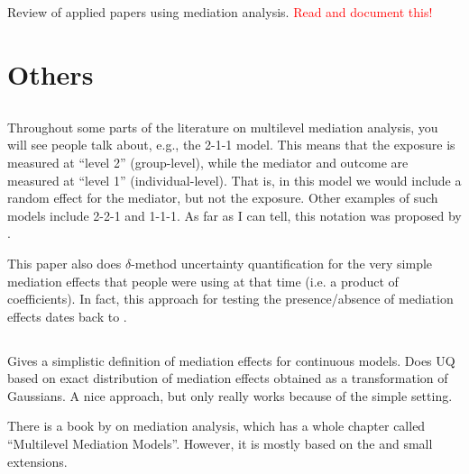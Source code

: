 \documentclass{report}
\begin{document}
\subsection{\citet{Rij21}}

Review of applied papers using mediation analysis. \textcolor{red}{Read and document this!}


\section{Others}
\label{sec:other}

\subsection{\citet{Kru01}}

Throughout some parts of the literature on multilevel mediation analysis, you will see people talk about, e.g., the 2-1-1 model. This means that the exposure is measured at ``level 2'' (group-level), while the mediator and outcome are measured at ``level 1'' (individual-level). That is, in this model we would include a random effect for the mediator, but not the exposure. Other examples of such models include 2-2-1 and 1-1-1. As far as I can tell, this notation was proposed by \citet{Kru01}.

This paper also does $\delta$-method uncertainty quantification for the very simple mediation effects that people were using at that time (i.e. a product of coefficients). In fact, this approach for testing the presence/absence of mediation effects dates back to \citet{Sob82}.

\subsection{\citet{Ken03}}

Gives a simplistic definition of mediation effects for continuous models. Does UQ based on exact distribution of mediation effects obtained as a transformation of Gaussians. A nice approach, but only really works because of the simple setting.

There is a book by \citet{Mac17} on mediation analysis, which has a whole chapter called ``Multilevel Mediation Models''. However, it is mostly based on the \citet{Ken03} and small extensions. 

\subsection{\citet{Rit04}}
\end{document}

